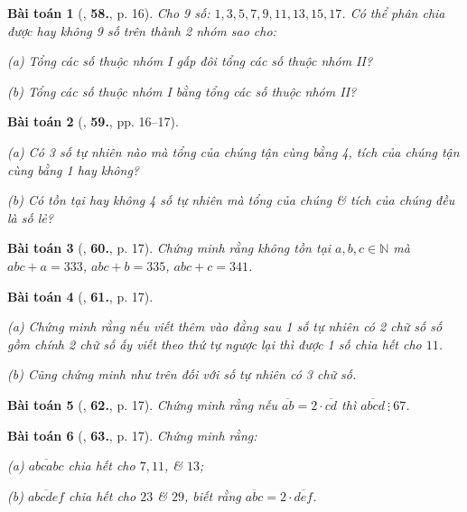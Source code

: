 \documentclass[oneside]{book}
\numberwithin{equation}{section}
\newtheorem{baitoan}{Bài toán}[section]
\begin{document}
\begin{baitoan}[\cite{Binh_Toan_6_tap_1}, \textbf{58.}, p. 16]
	Cho 9 số: $1,3,5,7,9,11,13,15,17$. Có thể phân chia được hay không 9 số trên thành 2 nhóm sao cho:
	\begin{enumerate*}
		\item[(a)] Tổng các số thuộc nhóm I gấp đôi tổng các số thuộc nhóm II?
		\item[(b)] Tổng các số thuộc nhóm I bằng tổng các số thuộc nhóm II?
	\end{enumerate*}
\end{baitoan}

\begin{baitoan}[\cite{Binh_Toan_6_tap_1}, \textbf{59.}, pp. 16--17]
	\begin{enumerate*}
		\item[(a)] Có 3 số tự nhiên nào mà tổng của chúng tận cùng bằng 4, tích của chúng tận cùng bằng 1 hay không?
		\item[(b)] Có tồn tại hay không 4 số tự nhiên mà tổng của chúng \& tích của chúng đều là số lẻ?
	\end{enumerate*}
\end{baitoan}

\begin{baitoan}[\cite{Binh_Toan_6_tap_1}, \textbf{60.}, p. 17]
	Chứng minh rằng không tồn tại $a,b,c\in\mathbb{N}$ mà $abc + a = 333$, $abc + b = 335$, $abc + c = 341$.
\end{baitoan}

\begin{baitoan}[\cite{Binh_Toan_6_tap_1}, \textbf{61.}, p. 17]
	\begin{enumerate*}
		\item[(a)] Chứng minh rằng nếu viết thêm vào đằng sau 1 số tự nhiên có 2 chữ số số gồm chính 2 chữ số ấy viết theo thứ tự ngược lại thì được 1 số chia hết cho $11$.
		\item[(b)] Cũng chứng minh như trên đối với số tự nhiên có 3 chữ số.
	\end{enumerate*}
\end{baitoan}

\begin{baitoan}[\cite{Binh_Toan_6_tap_1}, \textbf{62.}, p. 17]
	Chứng minh rằng nếu $\overline{ab} = 2\cdot\overline{cd}$ thì $\overline{abcd}\ \vdots\ 67$.
\end{baitoan}

\begin{baitoan}[\cite{Binh_Toan_6_tap_1}, \textbf{63.}, p. 17]
	Chứng minh rằng:
	\begin{enumerate*}
		\item[(a)] $\overline{abcabc}$ chia hết cho $7,11$, \& $13$;
		\item[(b)] $\overline{abcdef}$ chia hết cho $23$ \& $29$, biết rằng $\overline{abc} = 2\cdot\overline{def}$.
	\end{enumerate*}
\end{baitoan}
\end{document}
